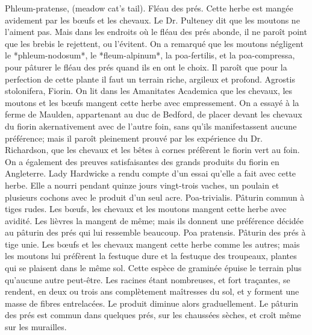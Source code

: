{Phleum-pratense, (meadow cat's tail). Fléau des prés. Cette herbe est mangée avidement par les bœufs et les chevaux. Le Dr. Pulteney dit que les moutons ne l'aiment pas. Mais dans les endroits où le fléau des prés abonde, il ne paroît point que les brebis le rejettent, ou l'évitent. On a remarqué que les moutons négligent le *phleum-nodosum*, le *fleum-alpinum*, la poa-fertilis, et la poa-compressa, pour pâturer le fléau des prés quand ils en ont le choix. Il paroît que pour la perfection de cette plante il faut un terrain riche, argileux et profond.
Agrostis stolonifera, Fiorin. On lit dans les Amanitates Academica que les chevaux, les moutons et les bœufs mangent cette herbe avec empressement. On a essayé à la ferme de Maulden, appartenant au duc de Bedford, de placer devant les chevaux du fiorin akernativement avec de l'autre foin, sans qu'ils manifestassent aucune préférence; mais il paroît pleinement prouvé par les expérience du Dr. Richardson, que les chevaux et les bêtes à cornes préfèrent le fiorin vert au foin. On a également des preuves satisfaisantes des grands produits du fiorin en Angleterre. Lady Hardwicke a rendu compte d'un essai qu'elle a fait avec cette herbe. Elle a nourri pendant quinze jours vingt-trois vaches, un poulain et plusieurs cochons avec le produit d'un seul acre.
Poa-trivialis. Pâturin commun à tiges rudes. Les bœufs, les chevaux et les moutons mangent cette herbe avec avidité. Les lièvres la mangent de même; mais ils donnent une préférence décidée au pâturin des prés qui lui ressemble beaucoup.
Poa pratensis. Pâturin des prés à tige unie. Les bœufs et les chevaux mangent cette herbe comme les autres; mais les moutons lui préfèrent la festuque dure et la festuque des troupeaux, plantes qui se plaisent dans le même sol. Cette espèce de graminée épuise le terrain plus qu'aucune autre peut-être. Les racines étant nombreuses, et fort traçantes, se rendent, en deux ou trois ans complètement maîtresses du sol, et y forment une masse de fibres entrelacées. Le produit diminue alors graduellement. Le pâturin des prés est commun dans quelques prés, sur les chaussées sèches, et croît même sur les murailles.
}
